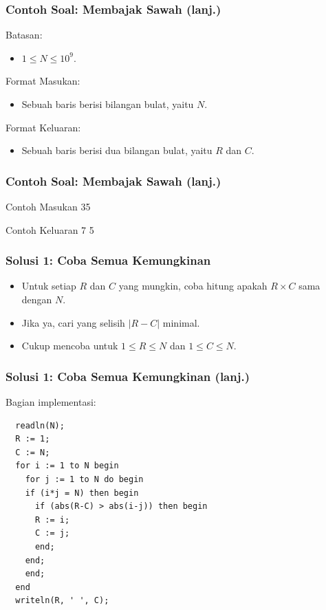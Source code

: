 \documentclass{beamer}
\begin{document}
\begin{frame}
\frametitle{Contoh Soal: Membajak Sawah (lanj.)}
Batasan:
\begin{itemize}
  \item $1 \le N \le 10^9$.
\end{itemize}

\hfill

Format Masukan:
\begin{itemize}
  \item Sebuah baris berisi bilangan bulat, yaitu $N$.
\end{itemize}

\hfill

Format Keluaran:
\begin{itemize}
  \item Sebuah baris berisi dua bilangan bulat, yaitu $R$ dan $C$.
\end{itemize}

\end{frame}

\begin{frame}
\frametitle{Contoh Soal: Membajak Sawah (lanj.)}

\begin{block}{Contoh Masukan}
35
\end{block}

\hfill

\begin{block}{Contoh Keluaran}
7 5
\end{block}

\end{frame}

\begin{frame}
\frametitle{Solusi 1: Coba Semua Kemungkinan}
\begin{itemize}
  \item Untuk setiap $R$ dan $C$ yang mungkin, coba hitung apakah $R \times C$ sama dengan $N$.
  \item Jika ya, cari yang selisih $|R-C|$ minimal.
  \item Cukup mencoba untuk $1 \le R \le N$ dan $1 \le C \le N$.
\end{itemize}
\end{frame}

\begin{frame}[fragile]
\frametitle{Solusi 1: Coba Semua Kemungkinan (lanj.)}
Bagian implementasi:
\begin{lstlisting}
  readln(N);
  R := 1;
  C := N;
  for i := 1 to N begin
    for j := 1 to N do begin
    if (i*j = N) then begin
      if (abs(R-C) > abs(i-j)) then begin
      R := i;
      C := j;
      end;
    end;
    end;
  end
  writeln(R, ' ', C);
\end{lstlisting}
\end{frame}
\end{document}
